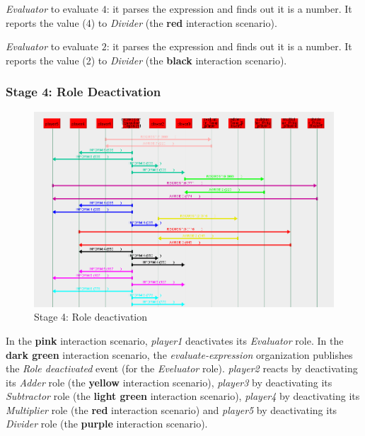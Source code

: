 \textit{Evaluator} to evaluate $4$: it parses the expression and finds out it is a number.
It reports the value (4) to \textit{Divider} (the \textbf{red} interaction scenario).

\textit{Evaluator} to evaluate $2$: it parses the expression and finds out it is a number.
It reports the value (2) to \textit{Divider} (the \textbf{black} interaction scenario).

\subsubsection*{Stage 4: Role Deactivation}

\begin{figure}[H]
	\centering
	\includegraphics[width=\textwidth]{images/example2-stage4.png}
	\caption{Stage 4: Role deactivation}
	\label{figure:example2-stage4}
\end{figure}

In the \textbf{pink} interaction scenario, \textit{player1} deactivates its \textit{Evaluator} role.
In the \textbf{dark green} interaction scenario, the \textit{evaluate-expression} organization publishes the \textit{Role deactivated} event (for the \textit{Eveluator} role).
\textit{player2} reacts by deactivating its \textit{Adder} role (the \textbf{yellow} interaction scenario), \textit{player3} by deactivating its \textit{Subtractor} role (the \textbf{light green} interaction scenario), \textit{player4} by deactivating its \textit{Multiplier} role (the \textbf{red} interaction scenario) and \textit{player5} by deactivating its \textit{Divider} role (the \textbf{purple} interaction scenario).

